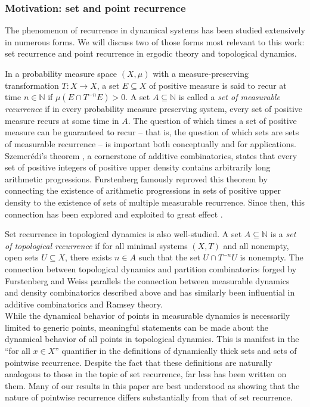 \documentclass[letter,11pt]{article}
\theoremstyle{plain}
\theoremstyle{definition}
\theoremstyle{plain}
\theoremstyle{plain}
\numberwithin{equation}{section}
\newcommand{\N}{\mathbb{N}}
\begin{document}
\subsubsection{Motivation: set and point recurrence}
\label{sec_intro_set_and_pt_recurrence}

The phenomenon of recurrence in dynamical systems has been studied extensively in numerous forms.  We will discuss two of those forms most relevant to this work: set recurrence and point recurrence in ergodic theory and topological dynamics.


In a probability measure space $(X, \mu)$ with a measure-preserving transformation $T: X \to X$, a set $E \subseteq X$ of positive measure is said to recur at time $n \in \N$ if $\mu(E \cap T^{-n} E) > 0$.  A set $A \subseteq \N$ is called a \emph{set of measurable recurrence} if in every probability measure preserving system, every set of positive measure recurs at some time in $A$.  The question of which times a set of positive measure can be guaranteed to recur -- that is, the question of which sets are sets of measurable recurrence -- is important both conceptually and for applications.  
Szemer\'edi's theorem \cite{Szemeredi-on_the_sets}, a cornerstone of additive combinatorics, states that every set of positive integers of positive upper density contains arbitrarily long arithmetic progressions. Furstenberg \cite{Furstenberg-ErgodicBehavior} famously reproved this theorem by connecting the existence of arithmetic progressions in sets of positive upper density to the existence of sets of multiple measurable recurrence.
Since then, this connection has been explored and exploited to great effect \cite{ward_ergodic_theory_interactions_survey}.

Set recurrence in topological dynamics is also well-studied.  A set $A \subseteq \N$ is a \emph{set of topological recurrence} if for all minimal systems $(X,T)$ and all nonempty, open sets $U \subseteq X$, there exists $n \in A$ such that the set $U \cap T^{-n}U$ is nonempty.  The connection between topological dynamics and partition combinatorics forged by Furstenberg and Weiss \cite{Furstenberg_Weiss-topological-dynamics} parallels the connection between measurable dynamics and density combinatorics described above and has similarly been influential in additive combinatorics and Ramsey theory.\\


While the dynamical behavior of points in measurable dynamics is necessarily limited to generic points, meaningful statements can be made about the dynamical behavior of all points in topological dynamics.  This is manifest in the ``for all $x \in X$'' quantifier in the definitions of dynamically thick sets and sets of pointwise recurrence.  Despite the fact that these definitions are naturally analogous to those in the topic of set recurrence, far less has been written on them.  Many of our results in this paper are best understood as showing that the nature of pointwise recurrence differs substantially from that of set recurrence.
\end{document}
